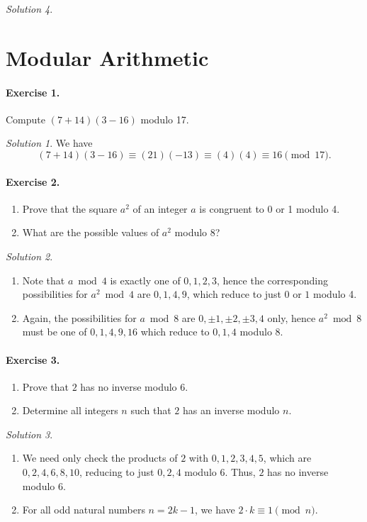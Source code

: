 \documentclass[11pt]{report}
\theoremstyle{remark}
\newtheorem*{solution}{Solution}
\begin{document}
\begin{solution}
    \section{Modular Arithmetic}

    \paragraph{Exercise 1.} Compute $(7 + 14)(3 - 16)$ modulo 17.
    \begin{solution}
        We have \[
            (7 + 14)(3 - 16) \equiv (21)(-13) \equiv (4)(4) \equiv 16 \pmod{17}.
        \] 
    \end{solution}

    \paragraph{Exercise 2.} \mbox{}
    \begin{enumerate}
        \itemsep0em
        \item Prove that the square $a^2$ of an integer $a$ is congruent to 0 or 1
        modulo 4.
        \item What are the possible values of $a^2$ modulo $8$?
    \end{enumerate}
    \begin{solution} \mbox{}
    \begin{enumerate}
        \item Note that $a \bmod{4}$ is exactly one of $0, 1, 2, 3$, hence the
        corresponding possibilities for $a^2 \bmod{4}$ are $0, 1, 4, 9$, which reduce
        to just $0$ or $1$ modulo 4.
        \item Again, the possibilities for $a\bmod{8}$ are $0, \pm 1, \pm 2, \pm 3,
        4$ only, hence $a^2 \bmod{8}$ must be one of $0, 1, 4, 9, 16$ which reduce to
        $0, 1, 4$ modulo 8.
    \end{enumerate}
    \end{solution}

    \paragraph{Exercise 3.} \mbox{}
    \begin{enumerate}
        \itemsep0em
        \item Prove that $2$ has no inverse modulo $6$.
        \item Determine all integers $n$ such that $2$ has an inverse modulo $n$.
    \end{enumerate}
    \begin{solution} \mbox{}
    \begin{enumerate}
        \item We need only check the products of $2$ with $0, 1, 2, 3, 4, 5$, which
        are $0, 2, 4, 6, 8, 10$, reducing to just $0, 2, 4$ modulo $6$. Thus, $2$ has
        no inverse modulo $6$.
        \item For all odd natural numbers $n = 2k - 1$, we have $2\cdot k \equiv 1
        \pmod{n}$.


\end{enumerate}
\end{solution}
\end{solution}
\end{document}
